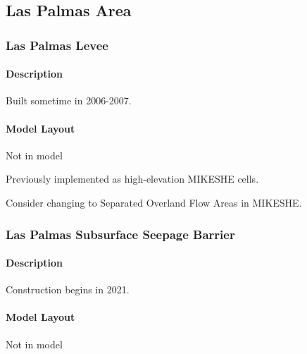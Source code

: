 \clearpage


\subsection{Las Palmas Area}

\subsubsection{Las Palmas Levee}

\paragraph{Description}
Built sometime in 2006-2007.

\paragraph{Model Layout}
Not in model


\begin{notes}
Previously implemented as high-elevation MIKESHE cells.

Consider changing to Separated Overland Flow Areas in MIKESHE.
\end{notes}


\subsubsection{Las Palmas Subsurface Seepage Barrier}

\paragraph{Description}
Construction begins in 2021.

\paragraph{Model Layout}
Not in model


